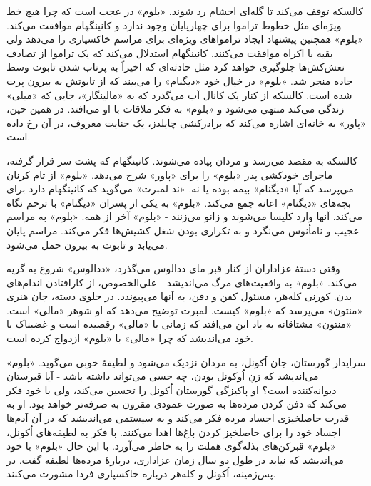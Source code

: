 \documentclass[12pt]{book}
\newcommand{\noun}[1]{«{#1}»}
\begin{document}
    کالسکه توقف می‌کند تا گله‌ای احشام رد شوند. \noun{بلوم} در عجب است که چرا هیچ خط ویژه‌ای مثل خطوط تراموا برای چهارپایان وجود ندارد و کانینگهام موافقت می‌کند. \noun{بلوم} همچنین پیشنهاد ایجاد ترامواهای ویژه‌ای برای مراسم خاکسپاری را می‌دهد ولی بقیه با اکراه موافقت می‌کنند. کانینگهام استدلال می‌کند که یک تراموا از تصادف نعش‌کش‌ها جلوگیری خواهد کرد مثل حادثه‌ای که اخیراً به پرتاب شدن تابوت وسط جاده منجر شد. \noun{بلوم} در خیال خود \noun{دیگنام} را می‌بیند که از تابوتش به بیرون پرت شده است. کالسکه از کنار یک کانال آب می‌گذرد که به \noun{مالینگار}، جایی که \noun{میلی} زندگی می‌کند منتهی می‌شود و \noun{بلوم} به فکر ملاقات با او می‌افتد. در همین حین، \noun{پاور} به خانه‌ای اشاره می‌کند که برادرکشی چایلدز، یک جنایت معروف، در آن رخ داده است.

    کالسکه به مقصد می‌رسد و مردان پیاده می‌شوند. کانینگهام که پشت سر قرار گرفته، ماجرای خودکشی پدر \noun{بلوم} را برای \noun{پاور} شرح می‌دهد. \noun{بلوم} از تام کرنان می‌پرسد که آیا \noun{دیگنام} بیمه بوده یا نه. \noun{ند لمبرت} می‌گوید که کانینگهام دارد برای بچه‌های \noun{دیگنام} اعانه جمع می‌کند. \noun{بلوم} به یکی از پسران \noun{دیگنام} با ترحم نگاه می‌کند. آنها وارد کلیسا می‌شوند و زانو می‌زنند - \noun{بلوم} آخر از همه. \noun{بلوم} به مراسم عجیب و نامأنوس می‌نگرد و به تکراری بودن شغل کشیش‌ها فکر می‌کند. مراسم پایان می‌یابد و تابوت به بیرون حمل می‌شود.

    وقتی دستۀ عزاداران از کنار قبر مای ددالوس می‌گذرد، \noun{ددالوس} شروع به گریه می‌کند. \noun{بلوم} به واقعیت‌های مرگ می‌اندیشد - علی‌الخصوص، از کارافتادن اندام‌های بدن. کورنی کله‌هر، مسئول کفن و دفن، به آنها می‌پیوندد. در جلوی دسته، جان هنری \noun{منتون} می‌پرسد که \noun{بلوم} کیست. لمبرت توضیح می‌دهد که او شوهر \noun{مالی} است. \noun{منتون} مشتاقانه به یاد این می‌افتد که زمانی با \noun{مالی} رقصیده است و غضبناک با خود می‌اندیشد که چرا \noun{مالی} با \noun{بلوم} ازدواج کرده است.

    سرایدار گورستان، جان اُکونل، به مردان نزدیک می‌شود و لطیفۀ خوبی می‌گوید. \noun{بلوم} می‌اندیشد که زنِ اُوکونل بودن، چه حسی می‌تواند داشته باشد - آیا قبرستان دیوانه‌کننده است؟ او پاکیزگی گورستان اُکونل را تحسین می‌کند، ولی با خود فکر می‌کند که دفن کردن مرده‌ها به صورت عمودی مقرون به صرفه‌تر خواهد بود. او به قدرت حاصلخیزی اجساد مرده فکر می‌کند و به سیستمی می‌اندیشد که در آن آدم‌ها اجساد خود را برای حاصلخیز کردن باغ‌ها اهدا می‌کنند. با فکر به لطیفه‌های اُکونل، \noun{بلوم} قبرکن‌های بذله‌گوی هملت را به خاطر می‌آورد. با این حال \noun{بلوم} با خود می‌اندیشد که نیابد در طول دو سال زمان عزاداری، دربارۀ مرده‌ها لطیفه گفت. در پس‌زمینه، اُکونل و کله‌هر درباره خاکسپاری فردا مشورت می‌کنند.
\end{document}
